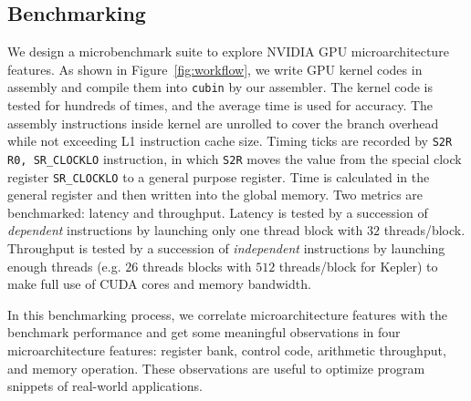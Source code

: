 \subsection{Benchmarking} %
\label{sec:benchmark}


We design a microbenchmark suite to explore NVIDIA GPU microarchitecture features.
As shown in Figure~\ref{fig:workflow}, we write GPU kernel codes in assembly and compile them into {\tt cubin} by our assembler.%
The kernel code is tested for hundreds of times, and the average time is used for accuracy.
The assembly instructions inside kernel are unrolled to cover the branch overhead while not exceeding L1 instruction cache size.
Timing ticks are recorded by {\tt S2R R0, SR\_CLOCKLO} instruction, in which
{\tt S2R} moves the value from the special clock register {\tt SR\_CLOCKLO} to a general
purpose register. 
Time is calculated in the general register and then written into the global memory.
Two metrics are benchmarked: latency and throughput. 
Latency is tested by a succession of \emph{dependent} instructions by launching only one thread block with $32$ threads/block.
Throughput is tested by a succession of \emph{independent} instructions by launching enough
threads (e.g. $26$ threads blocks with $512$ threads/block for Kepler) to make full use of CUDA cores and memory bandwidth.

In this benchmarking process, we correlate microarchitecture features with the benchmark performance and get some meaningful observations in four microarchitecture features: register bank, 
control code, arithmetic throughput, and memory operation. 
These observations are useful to optimize program snippets of real-world applications.


